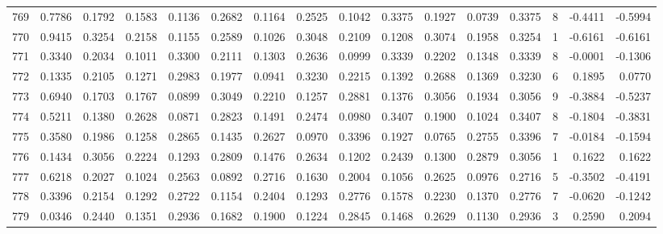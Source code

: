 \begin{tabular}{lrrrrrrrrrrrrrrr}
769 &      0.7786 &  0.1792 &  0.1583 &  0.1136 &  0.2682 &  0.1164 &  0.2525 &  0.1042 &  0.3375 &  0.1927 &   0.0739 &     0.3375 &      8 &                   -0.4411 &                    -0.5994 \\
770 &      0.9415 &  0.3254 &  0.2158 &  0.1155 &  0.2589 &  0.1026 &  0.3048 &  0.2109 &  0.1208 &  0.3074 &   0.1958 &     0.3254 &      1 &                   -0.6161 &                    -0.6161 \\
771 &      0.3340 &  0.2034 &  0.1011 &  0.3300 &  0.2111 &  0.1303 &  0.2636 &  0.0999 &  0.3339 &  0.2202 &   0.1348 &     0.3339 &      8 &                   -0.0001 &                    -0.1306 \\
772 &      0.1335 &  0.2105 &  0.1271 &  0.2983 &  0.1977 &  0.0941 &  0.3230 &  0.2215 &  0.1392 &  0.2688 &   0.1369 &     0.3230 &      6 &                    0.1895 &                     0.0770 \\
773 &      0.6940 &  0.1703 &  0.1767 &  0.0899 &  0.3049 &  0.2210 &  0.1257 &  0.2881 &  0.1376 &  0.3056 &   0.1934 &     0.3056 &      9 &                   -0.3884 &                    -0.5237 \\
774 &      0.5211 &  0.1380 &  0.2628 &  0.0871 &  0.2823 &  0.1491 &  0.2474 &  0.0980 &  0.3407 &  0.1900 &   0.1024 &     0.3407 &      8 &                   -0.1804 &                    -0.3831 \\
775 &      0.3580 &  0.1986 &  0.1258 &  0.2865 &  0.1435 &  0.2627 &  0.0970 &  0.3396 &  0.1927 &  0.0765 &   0.2755 &     0.3396 &      7 &                   -0.0184 &                    -0.1594 \\
776 &      0.1434 &  0.3056 &  0.2224 &  0.1293 &  0.2809 &  0.1476 &  0.2634 &  0.1202 &  0.2439 &  0.1300 &   0.2879 &     0.3056 &      1 &                    0.1622 &                     0.1622 \\
777 &      0.6218 &  0.2027 &  0.1024 &  0.2563 &  0.0892 &  0.2716 &  0.1630 &  0.2004 &  0.1056 &  0.2625 &   0.0976 &     0.2716 &      5 &                   -0.3502 &                    -0.4191 \\
778 &      0.3396 &  0.2154 &  0.1292 &  0.2722 &  0.1154 &  0.2404 &  0.1293 &  0.2776 &  0.1578 &  0.2230 &   0.1370 &     0.2776 &      7 &                   -0.0620 &                    -0.1242 \\
779 &      0.0346 &  0.2440 &  0.1351 &  0.2936 &  0.1682 &  0.1900 &  0.1224 &  0.2845 &  0.1468 &  0.2629 &   0.1130 &     0.2936 &      3 &                    0.2590 &                     0.2094 \\

\end{tabular}

